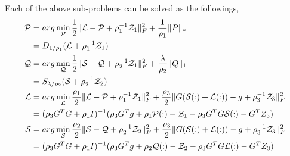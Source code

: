 \documentclass[a4paper,12pt]{article}
\theoremstyle{mystyle}
\begin{document}
\begin{CJK*}{GBK}{song}
Each of the above sub-problems can be solved as the followings,
\begin{align}
\mathcal{P}
&=arg\min_{\mathcal{P}}\frac{1}{2}\|\mathcal{L-P}+\rho_1^{-1}\mathcal{Z}_1\|_F^2
 +\frac{1}{\rho_1}\|P\|_*\notag\\
&=D_{1/\rho_1}(\mathcal{L}+\rho_1^{-1}\mathcal{Z}_1)\\
\mathcal{Q}
&=arg\min_{\mathcal{Q}}\frac{1}{2}\|\mathcal{S-Q}+\rho_2^{-1}\mathcal{Z}_1\|_F^2
 +\frac{\lambda}{\rho_2}\|Q\|_1\notag\\
&=S_{\lambda/\rho_2}(\mathcal{S}+\rho_2^{-1}\mathcal{Z}_2)\\
\mathcal{L}
&=arg\min_{\mathcal{L}}
\frac{\rho_1}{2}\|\mathcal{L-P}+\rho_1^{-1}\mathcal{Z}_1\|_{F}^2+
\frac{\rho_3}{2}\|G\mathcal{(S(:)+L(:))}-g+\rho_3^{-1}\mathcal{Z}_3\|_{F}^2\notag\\
&=(\rho_3 G^TG+\rho_1I)^{-1}
(\rho_3 G^T g+\rho_1\mathcal{P}(:)-\mathcal{Z}_1-\rho_3 G^TG\mathcal{S}(:)-G^TZ_3)\\
\mathcal{S}
&=arg\min_{\mathcal{S}}
\frac{\rho_2}{2}\|\mathcal{S-Q}+\rho_2^{-1}\mathcal{Z}_2\|_{F}^2+
\frac{\rho_3}{2}\|G\mathcal{(S(:)+L(:))}-g+\rho_3^{-1}\mathcal{Z}_3\|_{F}^2\notag\\
&=(\rho_3 G^TG+\rho_1I)^{-1}
(\rho_3 G^T g+\rho_2\mathcal{Q}(:)-\mathcal{Z}_2-\rho_3 G^TG\mathcal{L}(:)-G^TZ_3)
\end{align}


\end{CJK*}
\end{document}
